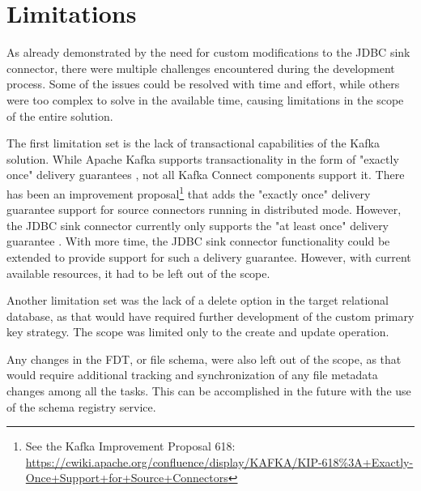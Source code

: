 
\section{Limitations}
\label{ch04:pipelinedevelopment:solutionlimitations}
As already demonstrated by the need for custom modifications to the \ac{JDBC} sink connector, there were multiple challenges encountered during the development process. Some of the issues could be resolved with time and effort, while others were too complex to solve in the available time, causing limitations in the scope of the entire solution.

The first limitation set is the lack of transactional capabilities of the Kafka solution. While Apache Kafka supports transactionality in the form of "exactly once" delivery guarantees \cite{kafkadocumentation}, not all Kafka Connect components support it. There has been an improvement proposal\footnote{See the Kafka Improvement Proposal 618: \url{https://cwiki.apache.org/confluence/display/KAFKA/KIP-618\%3A+Exactly-Once+Support+for+Source+Connectors}} that adds the "exactly once" delivery guarantee support for source connectors running in distributed mode. However, the \ac{JDBC} sink connector currently only supports the "at least once" delivery guarantee \cite{jdbcsinkdocumentation}. With more time, the \ac{JDBC} sink connector functionality could be extended to provide support for such a delivery guarantee. However, with current available resources, it had to be left out of the scope.

Another limitation set was the lack of a delete option in the target relational database, as that would have required further development of the custom primary key strategy. The scope was limited only to the create and update operation.

Any changes in the \ac{FDT}, or file schema, were also left out of the scope, as that would require additional tracking and synchronization of any file metadata changes among all the tasks. This can be accomplished in the future with the use of the schema registry service.


